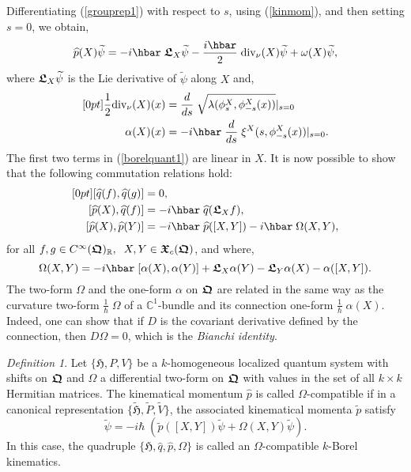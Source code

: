 \documentclass[11pt]{amsart}
\numberwithin{equation}{section}
\theoremstyle{remark}
\newcommand\HH{\mathfrak H}
\newcommand\RR{\mathbb R}
\newtheorem{defi}{Definition}[section]
\newcommand{\bedefin}{\begin{defi}}
\newcommand{\be}{\begin{equation}}
\newcommand{\en}{\end{equation}}
\newcommand{\htil}{\widetilde{\mathfrak H}}
\newcommand{\bfrakQ}{\mbox{\boldmath $\mathfrak Q$}}
\newcommand{\bfrakX}{\mbox{\boldmath $\mathfrak X$}}
\newcommand{\bfrakL}{\mbox{\boldmath $\mathfrak L$}}
\newcommand{\CinfRQ}{C^\infty(\bfrakQ)_{\RR}}
\begin{document}
Differentiating (\ref{grouprep1}) with respect to $s$, using (\ref{kinmom}),
and then setting $s=0$, we obtain,
\be
 \widehat{p} (X)\widetilde\psi = -i\hbar\;\bfrakL_X \widetilde\psi -
      \frac {i\hbar}2 \;\mbox{\rm div}_\nu (X) \widetilde\psi + \omega
(X)\widetilde\psi,
\label{borelquant1}
\en
where $\bfrakL_X \widetilde\psi$ is the Lie derivative of $\widetilde\psi$
along $X$ and,
\be \begin{aligned}[0pt]
 \frac 12 \mbox{\rm div}_\nu (X)(x) &= \frac d{ds}\;
         \sqrt{\lambda (\phi^X_s, \phi^X_{-s} (x))} \vert_{s=0}   \\
\alpha (X)(x) &= -i\hbar\; \frac d{ds}\;\xi^X (s, \phi^X_{-s} (x))\vert_{s=0}.
\end{aligned}  \label{borelquant2}  \en
The first two terms in (\ref{borelquant1}) are linear in $X$. It is now
possible to show that the following commutation relations hold:
\be \begin{aligned}[0pt]
  [\widehat{q}(f), \widehat{q}(g)] &= 0,  \\
\lbrack\widehat{p}(X),\widehat{q}(f)\rbrack  &=
  -i\hbar\;\widehat{q}(\bfrakL_X f),     \\
  \lbrack\widehat{p}(X),\widehat{p}(Y)\rbrack &= -i\hbar\;\widehat{p}([X,Y])
      -i\hbar\;\Omega (X,Y),
\end{aligned} \label{borelquant3} \en
for all $f, g \in \CinfRQ,\;\; X, Y \in \bfrakX_c (\bfrakQ )$, and where,
\be
  \Omega (X,Y) = -i\hbar\; [\alpha (X) , \alpha (Y)] + \bfrakL_X \alpha (Y) -
     \bfrakL_Y \alpha (X) -\alpha ([X,Y]) .
\label{borelquant4}
\en
The two-form $\Omega$ and the one-form $\alpha$ on $\bfrakQ$
are related in the same way as the curvature two-form
$\displaystyle{\frac 1\hbar}\;\Omega$ of a ${\mathbb C}^1$-bundle and its
connection one-form $\displaystyle{\frac 1\hbar}\;\alpha (X)$. Indeed, one can
show that if $D$ is the covariant derivative defined by the connection, then
$D\Omega = 0$, which is the {\em Bianchi identity\/}.

\bedefin
Let $\{\HH , P, V\}$ be a $k$-homogeneous localized quantum system with shifts
on $\bfrakQ$ and $\Omega$ a differential two-form on $\bfrakQ$ with values in
the set of all $k\times k$ Hermitian matrices. The kinematical momentum
$\widehat{p}$ is called $\Omega$-compatible if in a canonical representation
$\{\htil , \widetilde{P}, \widetilde{V}\}$, the associated kinematical momenta
$\widetilde{p}$ satisfy
\be
   [\widetilde{p}(X), \widetilde{p}(Y)]\widetilde{\psi}
   = -i\hbar \;(\widetilde{p}([X,Y])
    \widetilde{\psi} + \Omega (X,Y)\widetilde{\psi}).
\label{omegacomp}
\en
In this case, the quadruple $\{\HH , \widehat{q}, \widehat{p}, \Omega \}$ is
called an $\Omega$-compatible $k$-Borel kinematics.
\end{defi}
\end{document}
